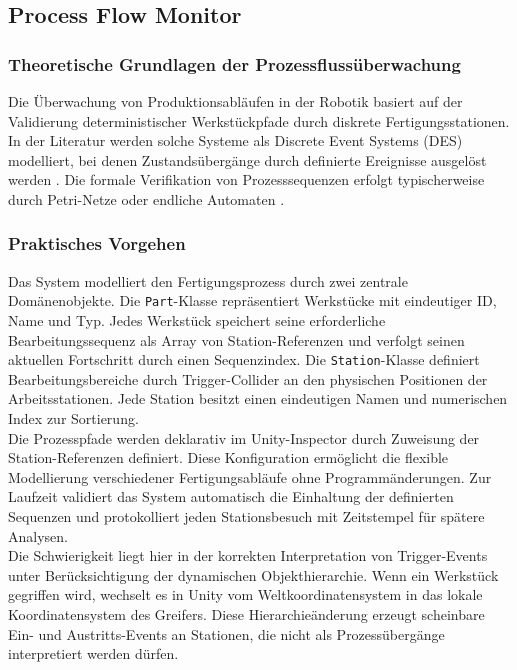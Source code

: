 \subsection{Process Flow Monitor}
\label{section:prozessfolgen}
\subsubsection{Theoretische Grundlagen der Prozessflussüberwachung}
\noindent
Die Überwachung von Produktionsabläufen in der Robotik basiert auf der Validierung
deterministischer Werkstückpfade durch diskrete Fertigungsstationen. In der
Literatur werden solche Systeme als Discrete Event Systems (DES) modelliert, bei
denen Zustandsübergänge durch definierte Ereignisse ausgelöst werden
. Die formale Verifikation von Prozesssequenzen
erfolgt typischerweise durch Petri-Netze oder endliche Automaten
.

\subsubsection{Praktisches Vorgehen}
\noindent
Das System modelliert den Fertigungsprozess durch zwei zentrale Domänenobjekte.
Die \texttt{Part}-Klasse repräsentiert Werkstücke mit eindeutiger ID, Name und
Typ. Jedes Werkstück speichert seine erforderliche Bearbeitungssequenz als
Array von Station-Referenzen und verfolgt seinen aktuellen Fortschritt durch
einen Sequenzindex. Die \texttt{Station}-Klasse definiert Bearbeitungsbereiche
durch Trigger-Collider an den physischen Positionen der Arbeitsstationen. Jede
Station besitzt einen eindeutigen Namen und numerischen Index zur Sortierung.\\

\noindent
Die Prozesspfade werden deklarativ im Unity-Inspector durch Zuweisung der
Station-Referenzen definiert. Diese Konfiguration ermöglicht die flexible
Modellierung verschiedener Fertigungsabläufe ohne Programmänderungen. Zur
Laufzeit validiert das System automatisch die Einhaltung der definierten
Sequenzen und protokolliert jeden Stationsbesuch mit Zeitstempel für spätere
Analysen.\\

\noindent
Die Schwierigkeit liegt hier in der korrekten Interpretation von
Trigger-Events unter Berücksichtigung der dynamischen Objekthierarchie. Wenn ein
Werkstück gegriffen wird, wechselt es in Unity vom Weltkoordinatensystem in das
lokale Koordinatensystem des Greifers. Diese Hierarchieänderung erzeugt
scheinbare Ein- und Austritts-Events an Stationen, die nicht als
Prozessübergänge interpretiert werden dürfen.\\

